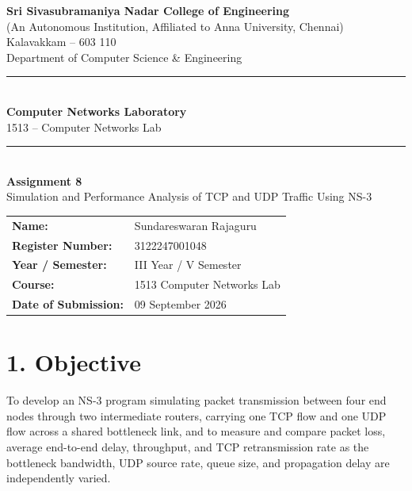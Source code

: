 \documentclass[11pt]{article}
\title{\vspace{-2cm}}
\date{}
\begin{document}
\begin{titlepage}
\centering
\vspace*{1cm}
{\large \textbf{Sri Sivasubramaniya Nadar College of Engineering}}\\
{\small (An Autonomous Institution, Affiliated to Anna University, Chennai)}\\
{\small Kalavakkam -- 603 110}\\[0.3cm]
{\small Department of Computer Science \& Engineering}\\[1.5cm]

\rule{\linewidth}{0.5mm}\\[0.4cm]
{\LARGE \textbf{Computer Networks Laboratory}}\\[0.3cm]
{\Large 1513 -- Computer Networks Lab}\\[0.4cm]
\rule{\linewidth}{0.5mm}\\[1.5cm]

{\huge \textbf{Assignment 8}}\\[0.4cm]
{\Large Simulation and Performance Analysis of TCP and UDP Traffic Using NS-3}\\[2cm]

\begin{center}
\begin{tabular}{ll}
\textbf{Name:} & Sundareswaran Rajaguru \\[0.2cm]
\textbf{Register Number:} & 3122247001048 \\[0.2cm]
\textbf{Year / Semester:} & III Year / V Semester \\[0.2cm]
\textbf{Course:} & 1513 Computer Networks Lab \\[0.2cm]
\textbf{Date of Submission:} & 09 September 2026 \\[0.2cm]
\end{tabular}
\end{center}

\vfill
\end{titlepage}

\section*{1. Objective}
To develop an NS-3 program simulating packet transmission between four end
nodes through two intermediate routers, carrying one TCP flow and one UDP
flow across a shared bottleneck link, and to measure and compare packet
loss, average end-to-end delay, throughput, and TCP retransmission rate as
the bottleneck bandwidth, UDP source rate, queue size, and propagation
delay are independently varied.
\end{document}
